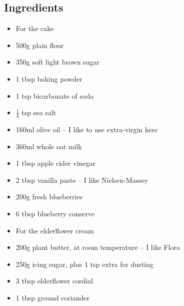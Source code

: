 \documentclass{book}
\begin{document}
\subsection*{Ingredients}
\begin{itemize}
\item For the cake 
\item 500g plain flour 
\item 350g soft light brown sugar 
\item 1 tbsp baking powder
\item 1 tsp bicarbonate of soda
\item $\frac{1}{4}$ tsp sea salt
\item 160ml olive oil – I like to use extra-virgin here
\item 360ml whole oat milk
\item 1 tbsp apple cider vinegar
\item 2 tbsp vanilla paste – I like Nielsen-Massey
\item 200g fresh blueberries
\item 6 tbsp blueberry conserve
\end{itemize}

\begin{itemize}
\item For the elderflower cream
\item 200g plant butter, at room temperature – I like Flora
\item 250g icing sugar, plus 1 tsp extra for dusting
\item 3 tbsp elderflower cordial
\item 1 tbsp ground coriander
\end{itemize}
\end{document}
